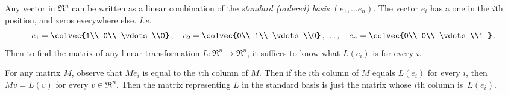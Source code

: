 \begin{example}
Any vector in $\Re^n$ can be written as a linear combination of the \emph{standard (ordered) basis} $(e_1,\dots e_n)$.  
The vector $e_i$ has a one in the $i$th position, and zeros everywhere else.  {\itshape I.e.}
\[
e_1=\colvec{1\\ 0\\ \vdots \\0}\, ,\quad e_2=\colvec{0\\ 1\\ \vdots \\0}\, ,\ldots,\quad e_n=\colvec{0\\ 0\\ \vdots \\1 }\, .
\]
Then to find the matrix of any linear transformation $L \colon \Re^n \rightarrow \Re^n$, it suffices to know what $L(e_i)$ is for every $i$.  

For any matrix $M$, observe that $Me_i$ is equal to the $i$th column of $M$.  Then if the $i$th column of $M$ equals $L(e_i)$ for every $i$, then $Mv=L(v)$ for every $v\in \Re^n$.  Then the matrix representing $L$ in the standard basis is just the matrix whose $i$th column is~$L(e_i)$. 


\end{example}
